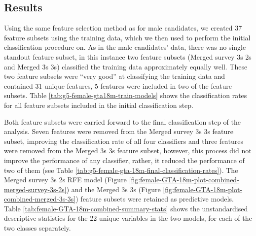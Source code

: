 \documentclass[
  12pt,
  a4paper,
]{book}
\begin{document}
\hypertarget{female-gta-results}{%
\subsection{Results}\label{female-gta-results}}

Using the same feature selection method as for male candidates, we created 37 feature subsets using the training data, which we then used to perform the initial classification procedure on. As in the male candidates' data, there was no single standout feature subset, in this instance two feature subsets (Merged survey 3s 2s and Merged 3s 3s) classified the training data approximately equally well. These two feature subsets were ``very good'' at classifying the training data and contained 31 unique features, 5 features were included in two of the feature subsets. Table \ref{tab:g5-female-gta18m-train-models} shows the classification rates for all feature subsets included in the initial classification step.

Both feature subsets were carried forward to the final classification step of the analysis. Seven features were removed from the Merged survey 3s 3s feature subset, improving the classification rate of all four classifiers and three features were removed from the Merged 3s 3s feature subset, however, this process did not improve the performance of any classifier, rather, it reduced the performance of two of them (see Table \ref{tab:g5-female-gta-18m-final-classification-rates}). The Merged survey 3s 2s RFE model (Figure \ref{fig:female-GTA-18m-plot-combined-merged-survey-3s-2s}) and the Merged 3s 3s (Figure \ref{fig:female-GTA-18m-plot-combined-merged-3s-3s}) feature subsets were retained as predictive models. Table \ref{tab:female-GTA-18m-combined-summary-stats} shows the unstandardised descriptive statistics for the 22 unique variables in the two models, for each of the two classes separately.

\end{document}
